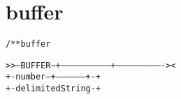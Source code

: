 \section{buffer}
\begin{shaded}
\begin{alltt}
/** buffer


   >>--BUFFER--+-----------------------------+----------------------------><
               +-number--+-----------------+-+
                         +-delimitedString-+

\end{alltt}
\end{shaded}
